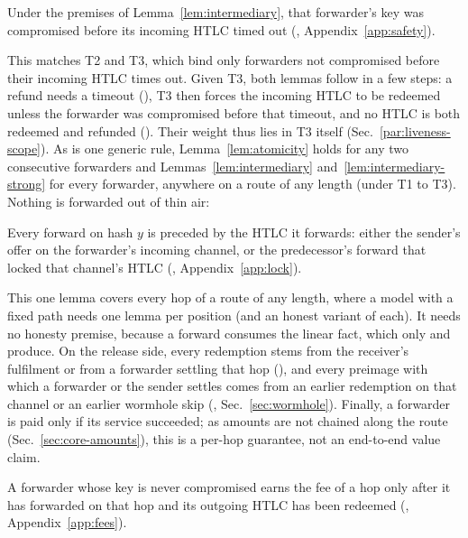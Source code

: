 \begin{lemma}\label{lem:intermediary-strong}
Under the premises of Lemma~\ref{lem:intermediary}, that forwarder's key was compromised before
its incoming HTLC timed out (, Appendix~\ref{app:safety}).
\end{lemma}
This matches T2 and T3, which bind only forwarders not compromised before their incoming HTLC
times out. Given T3, both lemmas follow in a few steps: a refund needs a timeout
(), T3 then forces the incoming HTLC to be redeemed unless the
forwarder was compromised before that timeout, and no HTLC is both redeemed and refunded
(). Their weight thus lies in T3 itself (Sec.~\ref{par:liveness-scope}). As  is one generic rule, Lemma~\ref{lem:atomicity} holds for any two
consecutive forwarders and Lemmas~\ref{lem:intermediary} and~\ref{lem:intermediary-strong} for
every forwarder, anywhere on a route of any length (under T1 to T3).
Nothing is forwarded out of thin air:

\begin{lemma}\label{lem:causality}
Every forward on hash $y$ is preceded by the HTLC it forwards: either the sender's offer on the
forwarder's incoming channel, or the predecessor's forward that locked that channel's HTLC
(, Appendix~\ref{app:lock}).
\end{lemma}
This one lemma covers every hop of a route of any length, where a model with a fixed path needs one lemma per position
(and an honest variant of each). It needs no honesty premise, because a forward consumes the
linear  fact, which only  and  produce. On
the release side, every redemption stems from the receiver's fulfilment or from a forwarder
settling that hop (), and every preimage with which a forwarder or the
sender settles comes from an earlier redemption on that channel or an earlier wormhole skip
(, Sec.~\ref{sec:wormhole}). Finally, a forwarder is paid only if its service succeeded; as amounts
are not chained along the route (Sec.~\ref{sec:core-amounts}), this is a per-hop guarantee, not
an end-to-end value claim.

\begin{lemma}\label{lem:fee}
A forwarder whose key is never compromised earns the fee of a hop only after it has forwarded
on that hop and its outgoing HTLC has been redeemed (,
Appendix~\ref{app:fees}).
\end{lemma}

